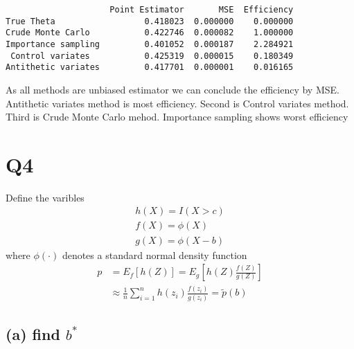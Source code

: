 \documentclass[11pt]{article}
\begin{document}
    
    \begin{verbatim}
                     Point Estimator       MSE  Efficiency
True Theta                  0.418023  0.000000    0.000000
Crude Monte Carlo           0.422746  0.000082    1.000000
Importance sampling         0.401052  0.000187    2.284921
 Control variates           0.425319  0.000015    0.180349
Antithetic variates         0.417701  0.000001    0.016165
    \end{verbatim}

    
    As all methods are unbiased estimator we can conclude the efficiency by
MSE. Antithetic variates method is most efficiency. Second is Control
variates method. Third is Crude Monte Carlo mehod. Importance sampling
shows worst efficiency

    \section{Q4}\label{q4}

Define the varibles \[
\begin{align*}
h(X) = I(X>c)\\
f(X) = \phi(X)\\
g(X) = \phi(X-b)
\end{align*}
\] where \(\phi(\cdot)\) denotes a standard normal density function \[
\begin{align*}
p &= E_f[h(Z)] = E_g \left[ h(Z)\frac{f(Z)}{g(Z)}\right]\\
&\approx \frac{1}{n} \sum_{i=1}^{n}h(z_i)\frac{f(z_i)}{g(z_i)} = \tilde{p}(b)
\end{align*} 
\]

    \subsection{\texorpdfstring{(a) find
\(b^*\)}{(a) find b\^{}*}}\label{a-find-b}
\end{document}

